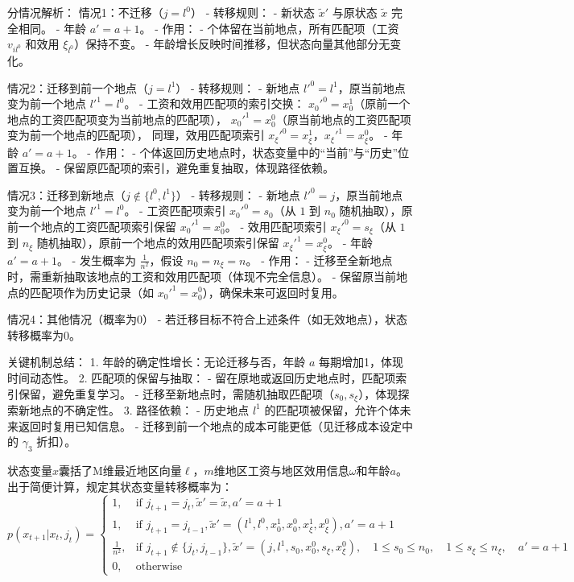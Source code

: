 \documentclass[a4paper,12pt,oneside]{book} %
\begin{document}
分情况解析：
情况1：不迁移（$j = l^0$）
- 转移规则：
  - 新状态 $\tilde{x}'$ 与原状态 $\tilde{x}$ 完全相同。
  - 年龄 $a' = a + 1$。
- 作用：
  - 个体留在当前地点，所有匹配项（工资 $v_{il^0}$ 和效用 $\xi_{l^0}$）保持不变。
  - 年龄增长反映时间推移，但状态向量其他部分无变化。

情况2：迁移到前一个地点（$j = l^1$）
- 转移规则：
  - 新地点 $l'^0 = l^1$，原当前地点变为前一个地点 $l'^1 = l^0$。
  - 工资和效用匹配项的索引交换：  
    $x_0'^0 = x_0^1$（原前一个地点的工资匹配项变为当前地点的匹配项），  
    $x_0'^1 = x_0^0$（原当前地点的工资匹配项变为前一个地点的匹配项），  
    同理，效用匹配项索引 $x_\xi'^0 = x_\xi^1$，$x_\xi'^1 = x_\xi^0$。
  - 年龄 $a' = a + 1$。
- 作用：
  - 个体返回历史地点时，状态变量中的“当前”与“历史”位置互换。
  - 保留原匹配项的索引，避免重复抽取，体现路径依赖。

情况3：迁移到新地点（$j \notin \{l^0, l^1\}$）
- 转移规则：
  - 新地点 $l'^0 = j$，原当前地点变为前一个地点 $l'^1 = l^0$。
  - 工资匹配项索引 $x_0'^0 = s_0$（从 $1$ 到 $n_0$ 随机抽取），原前一个地点的工资匹配项索引保留 $x_0'^1 = x_0^0$。
  - 效用匹配项索引 $x_\xi'^0 = s_\xi$（从 $1$ 到 $n_\xi$ 随机抽取），原前一个地点的效用匹配项索引保留 $x_\xi'^1 = x_\xi^0$。
  - 年龄 $a' = a + 1$。
  - 发生概率为 $\frac{1}{n^2}$，假设 $n_0 = n_\xi = n$。
- 作用：
  - 迁移至全新地点时，需重新抽取该地点的工资和效用匹配项（体现不完全信息）。
  - 保留原当前地点的匹配项作为历史记录（如 $x_0'^1 = x_0^0$），确保未来可返回时复用。

情况4：其他情况（概率为0）
- 若迁移目标不符合上述条件（如无效地点），状态转移概率为0。


关键机制总结：
1. 年龄的确定性增长：无论迁移与否，年龄 $a$ 每期增加1，体现时间动态性。
2. 匹配项的保留与抽取：
   - 留在原地或返回历史地点时，匹配项索引保留，避免重复学习。
   - 迁移至新地点时，需随机抽取匹配项（$s_0, s_\xi$），体现探索新地点的不确定性。
3. 路径依赖：
   - 历史地点 $l^1$ 的匹配项被保留，允许个体未来返回时复用已知信息。
   - 迁移到前一个地点的成本可能更低（见迁移成本设定中的 $\gamma_3$ 折扣）。







状态变量$x$囊括了M维最近地区向量$\ell$，$m$维地区工资与地区效用信息$\omega$和年龄$a$。出于简便计算，规定其状态变量转移概率为：
\begin{equation}
p(x_{t+1}|x_t, j_t) = 
\begin{cases} 
1, & \text{if } j_{t+1} = j_t, \tilde{x}' = \tilde{x}, a' = a + 1 \\
1, & \text{if } j_{t+1} = j_{t-1}, \tilde{x}' = (l^1, l^0, x_0^1, x_0^0, x_\xi^1, x_\xi^0), a' = a + 1 \\
\frac{1}{n^2}, & \text{if } j_{t+1} \notin \{j_t, j_{t-1}\}, \tilde{x}' = (j, l^1, s_0, x_0^0, s_\xi, x_\xi^0), \quad 1 \leq s_0 \leq n_0, \quad 1 \leq s_\xi \leq n_\xi, \quad a' = a + 1 \\
0, & \text{otherwise}
\end{cases}
\end{equation}
\end{document}
